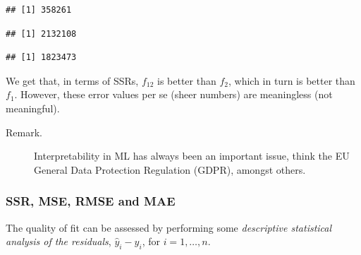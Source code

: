 \documentclass[10pt,b5paper,krantz1]{krantz}
\newenvironment{Shaded}{\begin{snugshade}}{\end{snugshade}}
\newcommand{\DecValTok}[1]{\textcolor[rgb]{0.06,0.06,0.06}{#1}}
\newcommand{\KeywordTok}[1]{\textcolor[rgb]{0.27,0.27,0.27}{\textbf{#1}}}
\newcommand{\NormalTok}[1]{#1}
\newcommand{\OperatorTok}[1]{\textcolor[rgb]{0.43,0.43,0.43}{\textbf{#1}}}
\begin{document}
\begin{Shaded}
\end{Shaded}

\begin{verbatim}
## [1] 358261
\end{verbatim}

\begin{Shaded}
\end{Shaded}

\begin{verbatim}
## [1] 2132108
\end{verbatim}

\begin{Shaded}
\end{Shaded}

\begin{verbatim}
## [1] 1823473
\end{verbatim}

We get that, in terms of SSRs, \(f_{12}\) is better than \(f_{2}\),
which in turn is better than \(f_{1}\).
However, these error values per se (sheer numbers)
are meaningless (not meaningful).

\begin{description}
\item[Remark.]
Interpretability in ML has always been an important issue, think the EU
General Data Protection Regulation (GDPR), amongst others.
\end{description}

\hypertarget{ssr-mse-rmse-and-mae}{%
\subsubsection{SSR, MSE, RMSE and MAE}\label{ssr-mse-rmse-and-mae}}

The quality of fit can be assessed by performing some \emph{descriptive
statistical analysis of the residuals}, \(\hat{y}_i-y_i\),
for \(i=1,\dots,n\).
\end{document}
